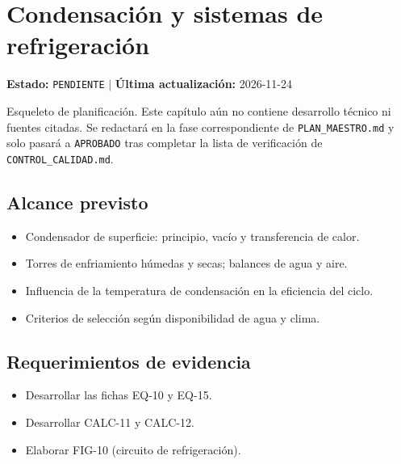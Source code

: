 \chapter{Condensación y sistemas de refrigeración}
\label{cap:07}

\begin{cajaestado}
\textbf{Estado:} \texttt{PENDIENTE} \quad$|$\quad
\textbf{Última actualización:} 2026-11-24

Esqueleto de planificación. Este capítulo aún no contiene desarrollo técnico ni
fuentes citadas. Se redactará en la fase correspondiente de
\texttt{PLAN\_MAESTRO.md} y solo pasará a \texttt{APROBADO} tras completar
la lista de verificación de \texttt{CONTROL\_CALIDAD.md}.
\end{cajaestado}

\section{Alcance previsto}
\begin{itemize}
  \item Condensador de superficie: principio, vacío y transferencia de calor.
  \item Torres de enfriamiento húmedas y secas; balances de agua y aire.
  \item Influencia de la temperatura de condensación en la eficiencia del ciclo.
  \item Criterios de selección según disponibilidad de agua y clima.
\end{itemize}

\section{Requerimientos de evidencia}
\begin{itemize}
  \item Desarrollar las fichas EQ-10 y EQ-15.
  \item Desarrollar CALC-11 y CALC-12.
  \item Elaborar FIG-10 (circuito de refrigeración).
\end{itemize}
